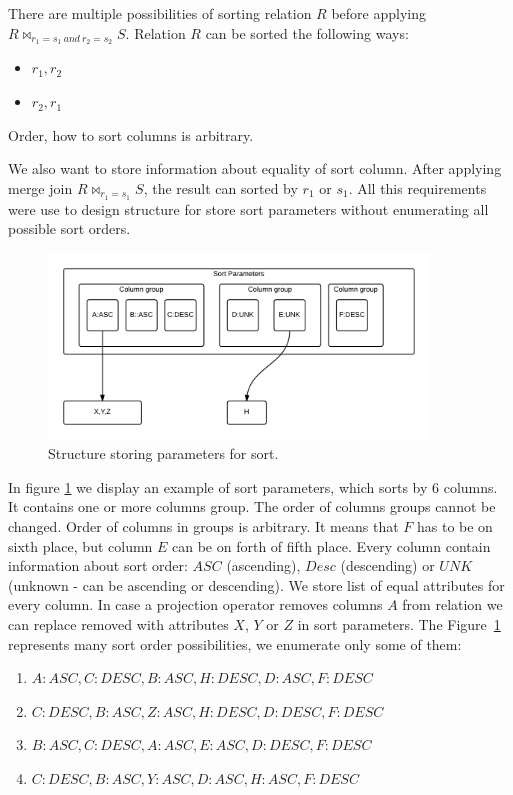 There are multiple possibilities of sorting relation $R$ before applying  $R\Join_{r_1=s_1~and~r_2=s_2} S$. Relation $R$ can be sorted the following ways:
\begin{itemize}
\item $r_1,r_2$
\item $r_2,r_1$
\end{itemize}
Order, how to sort columns is arbitrary.

We also want to store information about equality of sort column. After applying merge join $R\Join_{r_1=s_1} S$, the result can sorted by $r_1$ or $s_1$. All this requirements were use to design structure for store sort parameters without enumerating all possible sort orders.

\begin{figure}[h!]
  \centering
    \includegraphics[width=0.9\textwidth]{sortparameters}

      \caption{Structure storing parameters for sort.}
          \label{fig:sortparameters}
\end{figure}

In figure \ref{fig:sortparameters} we display an example of sort parameters, which sorts by 6 columns. It contains one or more columns group. The order of columns groups cannot be changed. Order of columns in groups is arbitrary. It means that $F$ has to be on sixth place, but column $E$ can be on forth of fifth place. Every column contain information about sort order: $ASC$ (ascending), $Desc$ (descending) or $UNK$ (unknown - can be ascending or descending). We store list of equal attributes for every column. In case a projection operator removes columns $A$ from relation we can replace removed with attributes $X$, $Y$ or $Z$ in sort parameters.
The Figure~\ref{fig:sortparameters} represents many sort order possibilities, we enumerate only some of them:
\begin{enumerate}
\item $A:ASC,C:DESC,B:ASC,H:DESC,D:ASC,F:DESC$
\item $C:DESC,B:ASC,Z:ASC,H:DESC,D:DESC,F:DESC$
\item $B:ASC,C:DESC,A:ASC,E:ASC,D:DESC,F:DESC$
\item $C:DESC,B:ASC,Y:ASC,D:ASC,H:ASC,F:DESC$
\end{enumerate}



